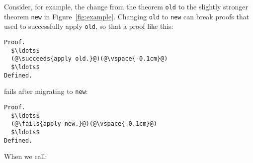 \begin{figure*}
\begin{minipage}{0.50\textwidth}
\lstset{language=coq, aboveskip=0pt, belowskip=0pt}






\end{minipage}
\hfill
\begin{minipage}{0.48\textwidth}
\lstset{language=coq, aboveskip=0pt, belowskip=0pt}






\end{minipage}
\caption{Two proofs with different conclusions (top) and the
corresponding proof terms (bottom) with relevant type information. We highlight the change in theorem conclusion and
the difference in terms that corresponds to a patch.}
\label{fig:example}
\end{figure*}

Consider, for example, the change from the theorem \lstinline{old} to the slightly stronger theorem \lstinline{new} in Figure~\ref{fig:example}.
Changing \lstinline{old} to \lstinline{new} can break proofs that used to successfully apply \lstinline{old}, so that a proof like this:

\begin{lstlisting}[language=coq]
Proof.
  $\ldots$
  (@\succeeds{apply old.}@)(@\vspace{-0.1cm}@)
  $\ldots$
Defined.
\end{lstlisting}
fails after migrating to \lstinline{new}:

\begin{lstlisting}[language=coq]
Proof.
  $\ldots$
  (@\fails{apply new.}@)(@\vspace{-0.1cm}@)
  $\ldots$
Defined.
\end{lstlisting}
When we call:

